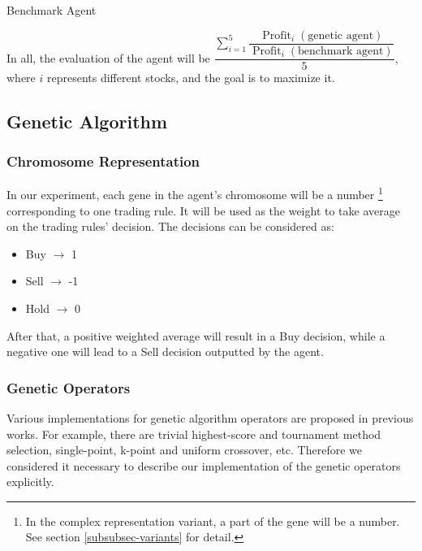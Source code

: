 \documentclass{article}
\begin{document}
\begin{algorithm}[H]

	\caption{Benchmark Agent}
\end{algorithm}

In all, the evaluation of the agent will be
$
\dfrac{\sum \limits_{i=1}^{5}
\dfrac{
    \operatorname{Profit}_i(\text{genetic agent})
}{
    \operatorname{Profit}_i(\text{benchmark agent})
}}{5}$, where $i$ represents different stocks, and the goal is to maximize it.


\subsection{Genetic Algorithm}

\subsubsection{Chromosome Representation}

In our experiment, each gene in the agent's chromosome will be a number
\footnote{In the complex representation variant,
a part of the gene will be a number.
See section \ref{subsubsec-variants} for detail.}
corresponding to one trading rule.
It will be used as the weight to take average on the trading rules' decision.
The decisions can be considered as:
\begin{itemize}
	\item Buy $\rightarrow$ 1
	\item Sell $\rightarrow$ -1
	\item Hold $\rightarrow$ 0
\end{itemize}

After that, a positive weighted average will result in a Buy decision,
while a negative one will lead to a Sell decision outputted by the agent.

\subsubsection{Genetic Operators}

Various implementations for genetic algorithm operators are proposed in previous works.
For example, there are trivial highest-score and tournament method\cite{a-note-on-boltzmann-tournament-selection} selection,
single-point, k-point and uniform crossover\cite{genetic-algorithm-review-and-application}, etc.
Therefore we considered it necessary to describe
our implementation of the genetic operators explicitly.
\end{document}
